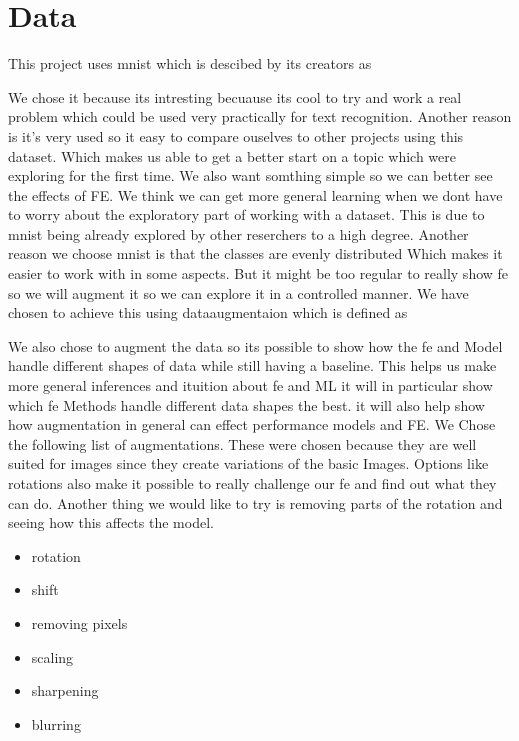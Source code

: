 \section{Data}\label{sec:data}
This project uses \gls{mnist} which is descibed by its creators as


We chose it because its intresting becuause its cool to try and work a real problem which could be used very practically for text recognition. Another reason is it's very used so it easy to compare ouselves to other projects using this dataset. Which makes us able to get a better start on a topic which were exploring for the first time. We also want somthing simple so we can better see the effects of FE. We think we can get more general learning when we dont have to worry about the exploratory part of working with a dataset. This is due to mnist being already explored by other reserchers to a high degree. Another reason we choose mnist is that the classes are evenly distributed Which makes it easier to work with in some aspects. But it might be too regular to really show \gls{fe} so we will augment it so we can explore it in a controlled manner.
We have chosen to achieve this using dataaugmentaion which is defined as


We also chose to augment the data so its possible to show how the \gls{fe} and Model handle different shapes of data while still having a baseline. This helps us make more general inferences and ituition about \gls{fe} and ML it will in particular show which \gls{fe} Methods handle different data shapes the best. it will also help show how augmentation in general can effect performance models  and FE.
We Chose the following list of augmentations.  These were chosen because they are well suited for images since they create variations of the basic Images. Options like rotations also make it possible to really challenge our \gls{fe} and find out what they can do. Another thing we would like to try is removing parts of the rotation and seeing how this affects the model.

\begin{itemize}
    \item rotation
    \item shift
    \item removing pixels
    \item scaling
    \item sharpening
    \item blurring
\end{itemize}
